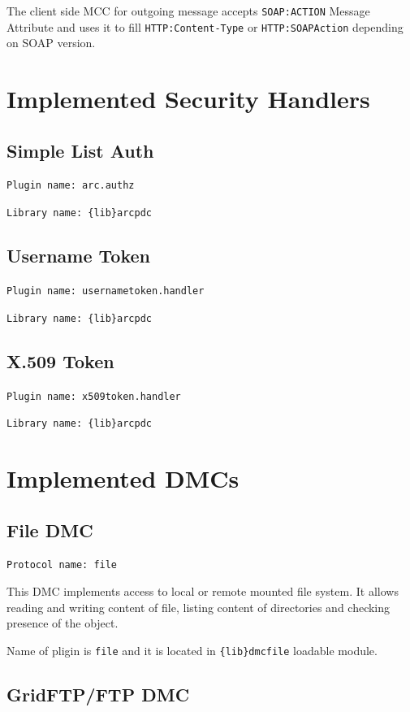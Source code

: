\documentclass{book}
\begin{document}
The client side MCC for outgoing message accepts \texttt{SOAP:ACTION} Message Attribute and uses it to fill \texttt{HTTP:Content-Type} or \texttt{HTTP:SOAPAction} depending on SOAP version.


\section{Implemented Security Handlers}


\subsection{Simple List Auth}

\texttt{Plugin name: arc.authz}

\texttt{Library name: \{lib\}arcpdc}


\subsection{Username Token}

\texttt{Plugin name: usernametoken.handler}

\texttt{Library name: \{lib\}arcpdc}


\subsection{X.509 Token}

\texttt{Plugin name: x509token.handler}

\texttt{Library name: \{lib\}arcpdc}


\section{Implemented DMCs}


\subsection{File DMC}

\texttt{Protocol name: file}

This DMC implements access to local or remote mounted file system. It allows reading and writing content of file, listing content of directories and checking presence of the object.

Name of pligin is \texttt{file} and it is located in \texttt{\{lib\}dmcfile} loadable module.


\subsection{GridFTP/FTP DMC}
\end{document}
